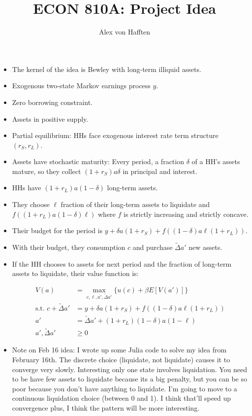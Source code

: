 \documentclass{article}
\title{ECON 810A: Project Idea}
\author{Alex von Hafften }
\begin{document}
\maketitle

\begin{itemize}

\section{February 18th} 

\item The kernel of the idea is Bewley with long-term illiquid assets. 
\item Exogenous two-state Markov earnings process $y$.
\item Zero borrowing constraint.
\item Assets in positive supply. 
\item Partial equilibrium: HHs face exogenous interest rate term structure $(r_S, r_L)$.
\item Assets have stochastic maturity: Every period, a fraction $\delta$ of a HH's assets mature, so they collect $(1 + r_S)a\delta$ in principal and interest.  
\item HHs have $(1+r_L)a(1-\delta)$ long-term assets.
\item They choose $\ell$ fraction of their long-term assets to  liquidate and $f((1+r_L)a(1-\delta)\ell)$ where $f$ is strictly increasing and strictly concave.
\item Their budget for the period is $y + \delta a (1+r_S) + f((1-\delta)a\ell(1+r_L))$.
\item With their budget, they consumption $c$ and purchase $\tilde{\Delta} a'$ new assets.
\item If the HH chooses to assets for next period and the fraction of long-term assets to liquidate, their value function is:

\begin{align*}
V(a) &= \max_{c, \ell, a',  \tilde{\Delta} a'}\{u(c) + \beta E[V(a')]\} \\
\text{s.t. } c + \tilde{\Delta} a' &= y + \delta a (1+r_S) + f((1-\delta)a\ell(1+r_L))\\
a' &= \tilde{\Delta} a' + (1+r_L)(1-\delta)a(1-\ell)\\
a', \tilde{\Delta} a' &\ge 0
\end{align*}


\item Note on Feb 16 idea: I wrote up some Julia code to solve my idea from February 16th.  The discrete choice (liquidate, not liquidate) causes it to converge very slowly.  Interesting only one state involves liquidation.  You need to be have few assets to liquidate because its a big penalty, but you can be so poor because you don't have anything to liquidate.  I'm going to move to a continuous liquidation choice (between 0 and 1). I think that'll speed up convergence plus, I think the pattern will be more interesting.


\end{itemize}
\end{document}
